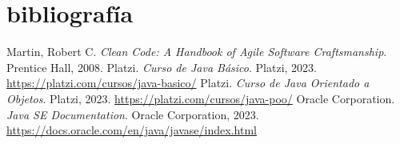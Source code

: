 \documentclass{article}
\begin{document}
\newpage
\section{bibliografía}
\begin{thebibliography}{9}
 Martin, Robert C. \textit{Clean Code: A Handbook of Agile Software Craftsmanship}. Prentice Hall, 2008.
 Platzi. \textit{Curso de Java Básico}. Platzi, 2023. \url{https://platzi.com/cursos/java-basico/}
 Platzi. \textit{Curso de Java Orientado a Objetos}. Platzi, 2023. \url{https://platzi.com/cursos/java-poo/}
 Oracle Corporation. \textit{Java SE Documentation}. Oracle Corporation, 2023. \url{https://docs.oracle.com/en/java/javase/index.html}
\end{thebibliography}
\end{document}
